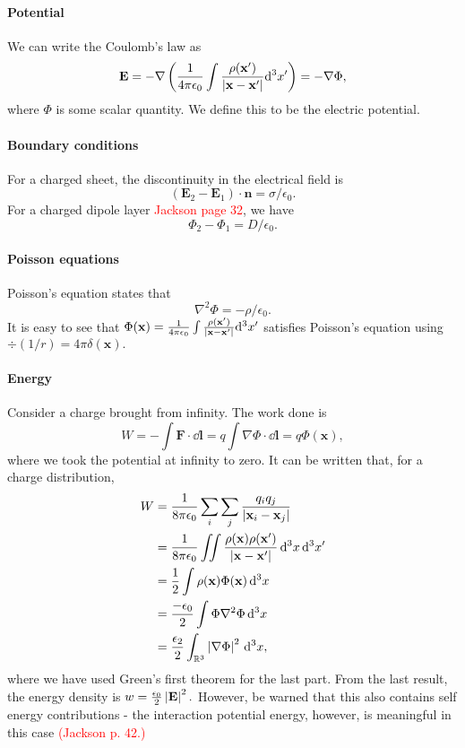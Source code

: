 \documentclass{article}
\begin{document}
\paragraph{Potential}
We can write the Coulomb's law as 
$$\mathbf E=-\nabla\left(\frac 1{4\pi\epsilon_0}\int\frac{\rho(\mathbf x')}{\left\lvert\mathbf x-\mathbf x'\right\rvert}\dd^3x'\right)=-\nabla\Phi,$$
where $\Phi$ is some scalar quantity. We define this to be the electric potential.


\paragraph{Boundary conditions}

For a charged sheet, the discontinuity in the electrical field is 
$$(\mathbf E_2-\mathbf E_1)\cdot\mathbf n=\sigma/\epsilon_0.$$
For a charged dipole layer \textcolor{red}{Jackson page 32}, we have
$$\Phi_2-\Phi_1=D/\epsilon_0.$$

\paragraph{Poisson equations}

Poisson's equation states that
$$\nabla^2\Phi=-\rho/\epsilon_0.$$
It is easy to see that $\Phi(\mathbf x)=\frac 1{4\pi\epsilon_0}\int\frac{\rho(\mathbf x')}{\left\lvert\mathbf x-\mathbf x'\right\rvert}\dd^3x'$ satisfies Poisson's equation using $\div(1/r)=4\pi\delta(\mathbf x).$


\paragraph{Energy} Consider a charge brought from infinity. The work done is 
$$W=-\int\mathbf F\cdot\dd\mathbf l=q\int\nabla\Phi\cdot\dd\mathbf l=q\Phi(\mathbf x),$$
where we took the potential at infinity to zero. It can be written that, for a charge distribution,
\begin{align*}
    W&=\frac 1{8\pi\epsilon_0}\sum_i\sum_j\frac{q_iq_j}{\left\lvert\mathbf x_i-\mathbf x_j\right\rvert}\\
    &=\frac 1{8\pi\epsilon_0}\iint \frac{\rho(\mathbf x)\rho(\mathbf x')}{\left\lvert\mathbf x-\mathbf x'\right\rvert}\,\dd^3x\,\dd^3x'\\
    &=\frac 12\int\rho(\mathbf x)\Phi(\mathbf x)\,\dd^3x\\
    &=\frac{-\epsilon_0}2\int\Phi\nabla^2\Phi\,\dd^3x\\
    &=\frac{\epsilon_2}2\int_{\mathbb R^3}\left\lvert\nabla\Phi\right\rvert^2\,\dd^3x,
\end{align*}
where we have used Green's first theorem for the last part. From the last result, the energy density is $w=\frac{\epsilon_0}2\left\lvert\mathbf E\right\rvert^2.$ However, be warned that this also contains self energy contributions - the interaction potential energy, however, is meaningful in this case \textcolor{red}{(Jackson p. 42.)}
\end{document}
